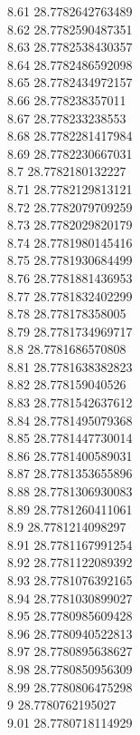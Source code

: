 {8.61	28.7782642763489\\
8.62	28.7782590487351\\
8.63	28.7782538430357\\
8.64	28.7782486592098\\
8.65	28.7782434972157\\
8.66	28.778238357011\\
8.67	28.778233238553\\
8.68	28.7782281417984\\
8.69	28.7782230667031\\
8.7	28.7782180132227\\
8.71	28.7782129813121\\
8.72	28.7782079709259\\
8.73	28.7782029820179\\
8.74	28.7781980145416\\
8.75	28.7781930684499\\
8.76	28.7781881436953\\
8.77	28.7781832402299\\
8.78	28.778178358005\\
8.79	28.7781734969717\\
8.8	28.7781686570808\\
8.81	28.7781638382823\\
8.82	28.778159040526\\
8.83	28.7781542637612\\
8.84	28.7781495079368\\
8.85	28.7781447730014\\
8.86	28.7781400589031\\
8.87	28.7781353655896\\
8.88	28.7781306930083\\
8.89	28.7781260411061\\
8.9	28.7781214098297\\
8.91	28.7781167991254\\
8.92	28.7781122089392\\
8.93	28.7781076392165\\
8.94	28.7781030899027\\
8.95	28.7780985609428\\
8.96	28.7780940522813\\
8.97	28.7780895638627\\
8.98	28.7780850956309\\
8.99	28.7780806475298\\
9	28.7780762195027\\
9.01	28.7780718114929\\
}
